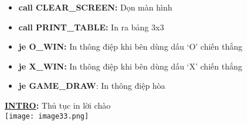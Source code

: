\begin{itemize}
    \begin{itemize}
        \item \textbf{call CLEAR\_SCREEN:} Dọn màn hình
        \item \textbf{call PRINT\_TABLE:} In ra bảng 3x3
        \item \textbf{je O\_WIN:} In thông điệp khi bên dùng dấu ‘O’ chiến thắng
        \item \textbf{je X\_WIN:} In thông điệp khi bên dùng dấu ‘X’ chiến thắng 
        \item \textbf{je GAME\_DRAW}: In thông điệp hòa
    \end{itemize}

\end{itemize}


\textbf{\underline{INTRO}: }Thủ tục in lời chào\\
\texttt{[image: image33.png]}

